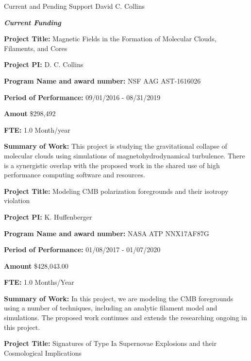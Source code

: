 \documentclass[10pt]{article}
\begin{document}
\newcommand{\LT}[1]{\noindent\textbf{#1}}
\begin{LARGE}
\noindent Current and Pending Support David C. Collins
\end{LARGE}



\vspace{0.1in}

\noindent \large{\textbf{\emph{Current Funding}}}

\vspace{0.1in}

\LT{Project Title:} Magnetic Fields in the Formation of Molecular Clouds,
Filaments, and Cores

\LT{Project PI:} D. C. Collins

\LT{Program Name and award number:} NSF AAG  AST-1616026 

\LT{Period of Performance:} 09/01/2016 - 08/31/2019

\LT{Amout} \$298,492 

\LT{FTE:} 1.0 Month/year

\LT{Summary of Work:} This project is studying the gravitational collapse of
molecular clouds using simulations of magnetohydrodynamical turbulence.  There
is a synergistic overlap with the proposed work in the shared use of high
performance computing software and resources.

\vspace{0.1in}


\LT{Project Title:} Modeling CMB polarization foregrounds and their isotropy
violation

\LT{Project PI:} K. Huffenberger 

\LT{Program Name and award number:} NASA ATP  NNX17AF87G

\LT{Period of Performance:} 01/08/2017 - 01/07/2020

\LT{Amount} \$428,043.00

\LT{FTE:} 1.0 Months/Year

\LT{Summary of Work:} In this project, we are modeling the CMB foregrounds using
a number of techniques, including an analytic filament model and simulations.
The proposed work continues and extends the researching ongoing in this project.

\vspace{0.1in}

\LT{Project Title:} Signatures of Type Ia Supernovae Explosions and their
Cosmological Implications
\end{document}
